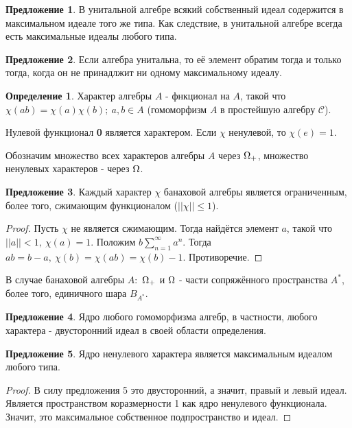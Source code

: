 \documentclass[12pt]{extarticle}
\theoremstyle{definition}
\newtheorem{definition}{\indent Определение}[section]
\newtheorem{suggestion}{\indent Предложение}[section]
\begin{document}
   \begin{suggestion}
    В унитальной алгебре всякий собственный идеал содержится в максимальном идеале того же типа. Как следствие, в унитальной алгебре всегда есть максимальные идеалы любого типа.
    \end{suggestion}
    
    \begin{suggestion}
    Если алгебра унитальна, то её элемент обратим тогда и только тогда, когда он не принадлжит ни одному максимальному идеалу.
    \end{suggestion}
    
    \begin{definition}
    Характер алгебры $A$ - фнкционал на $A$, такой что $\chi(ab) = \chi(a)\chi(b);\ a,b \in A$ (гомоморфизм $A$ в простейшую алгебру $\mathcal{C}$).
    \end{definition}
    
    Нулевой функционал \textbf{0} является характером. Если $\chi$ ненулевой, то $\chi(e) = 1$.
    
    Обозначим множество всех характеров алгебры $A$ через $\ohm_+$, множество ненулевых характеров - через $\ohm$.
    
    \begin{suggestion}
    Каждый характер $\chi$ банаховой алгебры является ограниченным, более того, сжимающим функционалом ($||\chi|| \leq 1$).
    \end{suggestion}
    \begin{proof}
    Пусть $\chi$ не является сжимающим. Тогда найдётся элемент $a$, такой что $||a|| < 1,\ \chi(a) = 1$. Положим $b \sum \limits_{n=1}^{\infty}a^n$. Тогда $ab = b - a,\ \chi(b) = \chi(ab) = \chi(b) - 1$. Противоречие. 
    \end{proof}
    
    В случае банаховой алгебры $A$:\ $\ohm_+$ и $\ohm$ - части сопряжённого пространства $A^*$, более того, единичного шара $B_{A^*}$.
    
       \begin{suggestion}
    Ядро любого гомоморфизма алгебр, в частности, любого характера - двусторонний идеал в своей области определения.
    \end{suggestion} 
    
    \begin{suggestion}
    Ядро ненулевого характера является максимальным идеалом любого типа.
    \end{suggestion} 
    \begin{proof}
    В силу предложения 5 это двусторонний, а значит, правый и левый идеал. Является пространством коразмерности 1 как ядро ненулевого функционала. Значит, это максимальное собственное подпространство и идеал.
    \end{proof}
    
\end{document}
